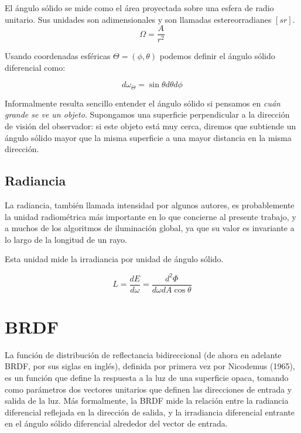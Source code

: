 El ángulo sólido se mide como el área proyectada sobre una esfera de radio unitario. Sus unidades son adimensionales y son llamadas estereorradianes $[sr]$.
\begin{equation}
\Omega = \frac{A}{r^2}
\end{equation}


Usando coordenadas esféricas $\Theta = (\phi , \theta )$ podemos definir el ángulo sólido diferencial como:

\begin{equation}
d \omega _ \Theta = \sin \theta d \theta d \phi
\end{equation}

Informalmente resulta sencillo entender el ángulo sólido si  pensamos en \emph{cuán grande se ve un objeto}. Supongamos una superficie perpendicular a la dirección de visión del observador: si  este objeto está muy cerca, diremos que subtiende un ángulo sólido mayor que la misma superficie a una mayor distancia en la misma dirección.

\clearpage

\subsection{Radiancia}

La radiancia, también llamada intensidad por algunos autores, es probablemente la unidad radiométrica más importante en lo que concierne al presente trabajo, y a muchos de los algoritmos de iluminación global, ya que su valor es invariante a lo largo de la longitud de un rayo.

Esta unidad mide la irradiancia por unidad de ángulo sólido.

\begin{equation}
L = \frac{dE}{d\omega} = \frac{d^2\Phi}{d\omega dA\cos \theta} 
\end{equation}


\clearpage

\section{BRDF}

La función de distribución de reflectancia bidireccional (de ahora en adelante BRDF, por sus siglas en inglés), definida por primera vez por \cite{Nicodemus1965} Nicodemus (1965), es un función que define la respuesta a la luz de una superficie opaca, tomando como parámetros dos vectores unitarios que definen las direcciones de entrada y salida de la luz. Más formalmente, la BRDF mide la relación entre la radiancia diferencial reflejada en la dirección de salida, y la irradiancia diferencial entrante en el ángulo sólido diferencial alrededor del vector de entrada.

